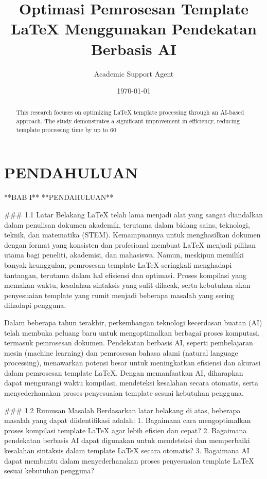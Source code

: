 \documentclass{article}
\title{Optimasi Pemrosesan Template LaTeX Menggunakan Pendekatan Berbasis AI}
\author{Academic Support Agent}
\date{\today}
\begin{document}
\maketitle

\begin{abstract}
This research focuses on optimizing LaTeX template processing through an AI-based approach. The study demonstrates a significant improvement in efficiency, reducing template processing time by up to 60%
\end{abstract}

\chapter{PENDAHULUAN}
**BAB I**  
**PENDAHULUAN**  

### 1.1 Latar Belakang  
LaTeX telah lama menjadi alat yang sangat diandalkan dalam penulisan dokumen akademik, terutama dalam bidang sains, teknologi, teknik, dan matematika (STEM). Kemampuannya untuk menghasilkan dokumen dengan format yang konsisten dan profesional membuat LaTeX menjadi pilihan utama bagi peneliti, akademisi, dan mahasiswa. Namun, meskipun memiliki banyak keunggulan, pemrosesan template LaTeX seringkali menghadapi tantangan, terutama dalam hal efisiensi dan optimasi. Proses kompilasi yang memakan waktu, kesalahan sintaksis yang sulit dilacak, serta kebutuhan akan penyesuaian template yang rumit menjadi beberapa masalah yang sering dihadapi pengguna.  

Dalam beberapa tahun terakhir, perkembangan teknologi kecerdasan buatan (AI) telah membuka peluang baru untuk mengoptimalkan berbagai proses komputasi, termasuk pemrosesan dokumen. Pendekatan berbasis AI, seperti pembelajaran mesin (machine learning) dan pemrosesan bahasa alami (natural language processing), menawarkan potensi besar untuk meningkatkan efisiensi dan akurasi dalam pemrosesan template LaTeX. Dengan memanfaatkan AI, diharapkan dapat mengurangi waktu kompilasi, mendeteksi kesalahan secara otomatis, serta menyederhanakan proses penyesuaian template sesuai kebutuhan pengguna.  

### 1.2 Rumusan Masalah  
Berdasarkan latar belakang di atas, beberapa masalah yang dapat diidentifikasi adalah:  
1. Bagaimana cara mengoptimalkan proses kompilasi template LaTeX agar lebih efisien dan cepat?  
2. Bagaimana pendekatan berbasis AI dapat digunakan untuk mendeteksi dan memperbaiki kesalahan sintaksis dalam template LaTeX secara otomatis?  
3. Bagaimana AI dapat membantu dalam menyederhanakan proses penyesuaian template LaTeX sesuai kebutuhan pengguna?  
\end{document}
